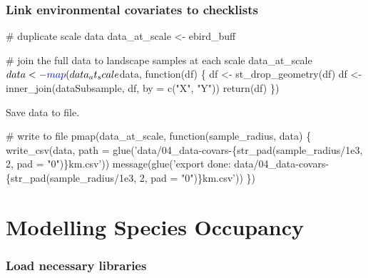 \documentclass[]{article}
\newenvironment{Shaded}{}{}
\newcommand{\CommentTok}[1]{\textcolor[rgb]{0.00,0.50,0.00}{#1}}
\newcommand{\ControlFlowTok}[1]{\textcolor[rgb]{0.00,0.00,1.00}{#1}}
\newcommand{\DataTypeTok}[1]{#1}
\newcommand{\KeywordTok}[1]{\textcolor[rgb]{0.00,0.00,1.00}{#1}}
\newcommand{\NormalTok}[1]{#1}
\newcommand{\OperatorTok}[1]{#1}
\newcommand{\StringTok}[1]{\textcolor[rgb]{0.00,0.50,0.50}{#1}}
\begin{document}
\hypertarget{link-environmental-covariates-to-checklists}{%
\subsubsection{Link environmental covariates to checklists}\label{link-environmental-covariates-to-checklists}}

\begin{Shaded}
\begin{Highlighting}[numbers=left,,]
\CommentTok{# duplicate scale data}
\NormalTok{data_at_scale <-}\StringTok{ }\NormalTok{ebird_buff}

\CommentTok{# join the full data to landscape samples at each scale}
\NormalTok{data_at_scale}\OperatorTok{$}\NormalTok{data <-}\StringTok{ }\KeywordTok{map}\NormalTok{(data_at_scale}\OperatorTok{$}\NormalTok{data, }\ControlFlowTok{function}\NormalTok{(df) \{}
\NormalTok{  df <-}\StringTok{ }\KeywordTok{st_drop_geometry}\NormalTok{(df)}
\NormalTok{  df <-}\StringTok{ }\KeywordTok{inner_join}\NormalTok{(dataSubsample, df, }\DataTypeTok{by =} \KeywordTok{c}\NormalTok{(}\StringTok{"X"}\NormalTok{, }\StringTok{"Y"}\NormalTok{))}
  \KeywordTok{return}\NormalTok{(df)}
\NormalTok{\})}
\end{Highlighting}
\end{Shaded}

Save data to file.

\begin{Shaded}
\begin{Highlighting}[numbers=left,,]
\CommentTok{# write to file}
\KeywordTok{pmap}\NormalTok{(data_at_scale, }\ControlFlowTok{function}\NormalTok{(sample_radius, data) \{}
  \KeywordTok{write_csv}\NormalTok{(data, }\DataTypeTok{path =} \KeywordTok{glue}\NormalTok{(}\StringTok{'data/04_data-covars-\{str_pad(sample_radius/1e3, 2, pad = "0")\}km.csv'}\NormalTok{))}
  \KeywordTok{message}\NormalTok{(}\KeywordTok{glue}\NormalTok{(}\StringTok{'export done: data/04_data-covars-\{str_pad(sample_radius/1e3, 2, pad = "0")\}km.csv'}\NormalTok{))}
\NormalTok{\})}
\end{Highlighting}
\end{Shaded}

\hypertarget{modelling-species-occupancy}{%
\section{Modelling Species Occupancy}\label{modelling-species-occupancy}}

\hypertarget{load-necessary-libraries}{%
\subsubsection{Load necessary libraries}\label{load-necessary-libraries}}
\end{document}
